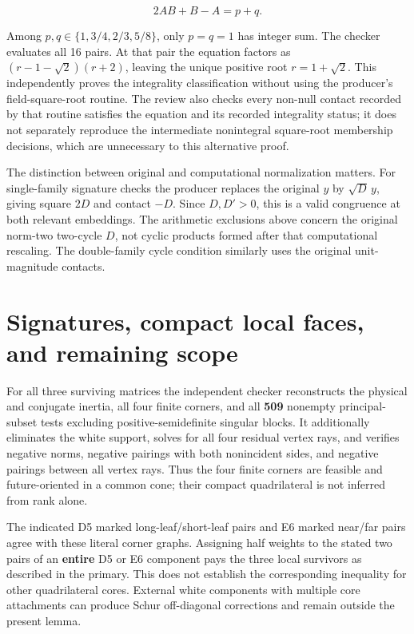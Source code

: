 \documentclass[
  10pt,
]{report}
\newcounter{none} %
\begin{document}
\[
2AB+B-A=p+q.
\]

Among \(p,q\in\{1,3/4,2/3,5/8\}\), only \(p=q=1\) has integer sum. The
checker evaluates all 16 pairs. At that pair the equation factors as
\((r-1-\sqrt2)(r+2)\), leaving the unique positive root \(r=1+\sqrt2\).
This independently proves the integrality classification without using
the producer's field-square-root routine. The review also checks every
non-null contact recorded by that routine satisfies the equation and its
recorded integrality status; it does not separately reproduce the
intermediate nonintegral square-root membership decisions, which are
unnecessary to this alternative proof.

The distinction between original and computational normalization
matters. For single-family signature checks the producer replaces the
original \(y\) by \(\sqrt D\,y\), giving square \(2D\) and contact
\(-D\). Since \(D,D'>0\), this is a valid congruence at both relevant
embeddings. The arithmetic exclusions above concern the original
norm-two two-cycle \(D\), not cyclic products formed after that
computational rescaling. The double-family cycle condition similarly
uses the original unit-magnitude contacts.

\section{Signatures, compact local faces, and remaining
scope}\label{signatures-compact-local-faces-and-remaining-scope}

For all three surviving matrices the independent checker reconstructs
the physical and conjugate inertia, all four finite corners, and all
\textbf{509} nonempty principal-subset tests excluding
positive-semidefinite singular blocks. It additionally eliminates the
white support, solves for all four residual vertex rays, and verifies
negative norms, negative pairings with both nonincident sides, and
negative pairings between all vertex rays. Thus the four finite corners
are feasible and future-oriented in a common cone; their compact
quadrilateral is not inferred from rank alone.

The indicated D5 marked long-leaf/short-leaf pairs and E6 marked
near/far pairs agree with these literal corner graphs. Assigning half
weights to the stated two pairs of an \textbf{entire} D5 or E6 component
pays the three local survivors as described in the primary. This does
not establish the corresponding inequality for other quadrilateral
cores. External white components with multiple core attachments can
produce Schur off-diagonal corrections and remain outside the present
lemma.
\end{document}
